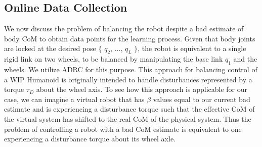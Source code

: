 \documentclass[letterpaper, 10 pt, conference]{ieeeconf}  %
\begin{document}
\subsection{Online Data Collection} \label{subsec: online}
We now discuss the problem of balancing the robot despite a bad estimate of body \ac{CoM} to obtain data points for the learning process. Given that body joints are locked at the desired pose $\{$ $q_2$, $...$, $q_L$ $\}$, the robot is equivalent to a single rigid link on two wheels, to be balanced by manipulating the base link $q_1$ and the wheels. We utilize \ac{ADRC} \cite{canete2012disturbance} for this purpose. This approach for balancing control of a \ac{WIP} Humanoid is originally intended to handle disturbances represented by a torque $\tau_D$ about the wheel axis. To see how this approach is applicable for our case, we can imagine a virtual robot that has $\beta$ values equal to our current bad estimate and is experiencing a disturbance torque such that the effective \ac{CoM} of the virtual system has shifted to the real \ac{CoM} of the physical system. Thus the problem of controlling a robot with a bad \ac{CoM} estimate is equivalent to one experiencing a disturbance torque about its wheel axle.
\end{document}
